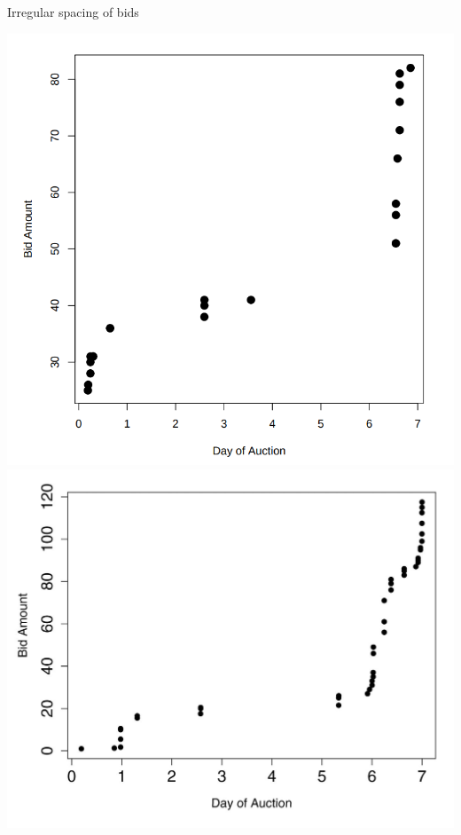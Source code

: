 \documentclass[hyperref={pdfpagelabels=false}]{beamer}
\begin{document}
    \begin{frame}{Irregular spacing of bids}
    \centering
    \begin{minipage}[c]{0.35\textwidth}
    \includegraphics[width=\textwidth]{Auction2.png}
    \includegraphics[width=\textwidth]{bid_history}
    \end{minipage}
    \begin{minipage}[c]{0.5\textwidth}

\end{minipage}
\end{frame}
\end{document}
